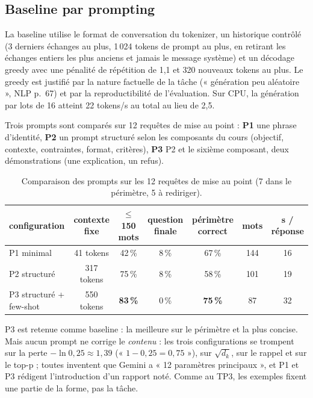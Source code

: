 \documentclass[10pt,a4paper]{article}
\begin{document}
\subsection{Baseline par prompting}

La baseline utilise le format de conversation du tokenizer, un historique contrôlé (3 derniers
échanges au plus, 1\,024 tokens de prompt au plus, en retirant les échanges entiers les plus anciens
et jamais le message système) et un décodage greedy avec une pénalité de répétition de 1,1 et
320 nouveaux tokens au plus. Le greedy est justifié par la nature factuelle de la tâche (« génération
peu aléatoire », NLP p.~67) et par la reproductibilité de l'évaluation. Sur CPU, la génération par
lots de 16 atteint 22 tokens/s au total au lieu de 2,5.

Trois prompts sont comparés sur 12 requêtes de mise au point : \textbf{P1} une phrase d'identité,
\textbf{P2} un prompt structuré selon les composants du cours (objectif, contexte, contraintes,
format, critères), \textbf{P3} P2 et le sixième composant, deux démonstrations (une explication, un
refus).

\begin{table}[H]
\centering\small
\caption{Comparaison des prompts sur les 12 requêtes de mise au point (7 dans le périmètre, 5 à rediriger).}
\begin{tabular}{lcccccc}
\toprule
configuration & contexte fixe & $\leq$ 150 mots & question finale & périmètre correct & mots & s / réponse \\
\midrule
P1 minimal & 41 tokens & 42\,\% & 8\,\% & 67\,\% & 144 & 16 \\
P2 structuré & 317 tokens & 75\,\% & 8\,\% & 58\,\% & 101 & 19 \\
P3 structuré + few-shot & 550 tokens & \textbf{83\,\%} & 0\,\% & \textbf{75\,\%} & 87 & 32 \\
\bottomrule
\end{tabular}
\end{table}

P3 est retenue comme baseline : la meilleure sur le périmètre et la plus concise. Mais aucun prompt ne
corrige le \emph{contenu} : les trois configurations se trompent sur la perte $-\ln 0{,}25 \approx 1{,}39$
(« $1 - 0{,}25 = 0{,}75$ »), sur $\sqrt{d_k}$, sur le rappel et sur le top-p ; toutes inventent que
Gemini a « 12 paramètres principaux », et P1 et P3 rédigent l'introduction d'un rapport noté. Comme au
TP3, les exemples fixent une partie de la forme, pas la tâche.
\end{document}

